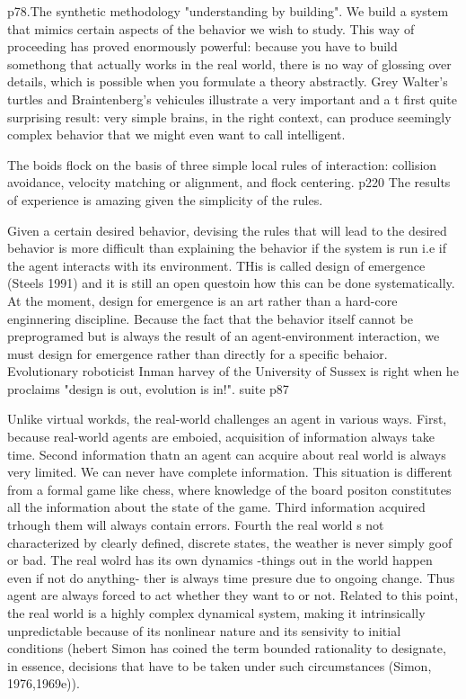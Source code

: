 p78.The synthetic methodology "understanding by building". We build a system that mimics certain aspects of the behavior we wish to study. This way of proceeding has proved enormously powerful: because you have to build somethong that actually works in the real world, there is no way of glossing over details, which is possible when you formulate a theory abstractly.
Grey Walter's turtles and Braintenberg's vehicules illustrate a very important and a t first quite surprising result: very simple brains, in the right context, can produce seemingly complex behavior that we might even want to call intelligent.


The boids flock on the basis of three simple local rules of interaction: collision avoidance, velocity matching or alignment, and flock centering. p220
The results of experience is amazing given the simplicity of the rules.

Given a certain desired behavior, devising the rules that will lead to the desired behavior is more difficult than explaining the behavior if the system is run i.e if the agent interacts with its environment. THis is called design of emergence (Steels 1991) and it is still an open questoin how this can be done systematically. At the moment, design for emergence is an art rather than a hard-core enginnering discipline. Because the fact that the behavior itself cannot be preprogramed but is always the result of an agent-environment interaction, we must design for emergence rather than directly for a specific behaior.
Evolutionary roboticist Inman harvey of the University of Sussex is right when he proclaims "design is out, evolution is in!". suite p87

Unlike virtual workds, the real-world challenges an agent in various ways. First, because real-world agents are emboied, acquisition of information always take time. Second information thatn an agent can acquire about real world is always very limited. We can never have complete information. This situation is different from a formal game like chess, where knowledge of the board positon constitutes all the information about the state of the game. Third information acquired trhough them will always contain errors. Fourth the real world s not characterized by clearly defined, discrete  states, the weather is never simply goof or bad.
The real wolrd has its own dynamics -things out in the world happen even if not do anything- ther is always time presure due to ongoing change. Thus agent are always forced to act whether they want to or not.
Related to this point, the real world is a highly complex dynamical system, making it intrinsically unpredictable because of its nonlinear nature and its sensivity to initial conditions (hebert Simon has coined the term bounded rationality to designate, in essence, decisions that have to be taken under such circumstances (Simon, 1976,1969e)).

